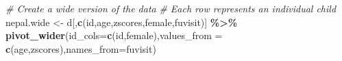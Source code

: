 \documentclass[
]{article}
\newenvironment{Shaded}{\begin{snugshade}}{\end{snugshade}}
\newcommand{\AttributeTok}[1]{\textcolor[rgb]{0.13,0.29,0.53}{#1}}
\newcommand{\CommentTok}[1]{\textcolor[rgb]{0.56,0.35,0.01}{\textit{#1}}}
\newcommand{\FunctionTok}[1]{\textcolor[rgb]{0.13,0.29,0.53}{\textbf{#1}}}
\newcommand{\NormalTok}[1]{#1}
\newcommand{\OtherTok}[1]{\textcolor[rgb]{0.56,0.35,0.01}{#1}}
\newcommand{\SpecialCharTok}[1]{\textcolor[rgb]{0.81,0.36,0.00}{\textbf{#1}}}
\newcommand{\StringTok}[1]{\textcolor[rgb]{0.31,0.60,0.02}{#1}}
\begin{document}
\begin{Shaded}
\begin{Highlighting}[]
\CommentTok{\# Create a wide version of the data}
\CommentTok{\# Each row represents an individual child}
\NormalTok{nepal.wide }\OtherTok{\textless{}{-}}\NormalTok{ d[,}\FunctionTok{c}\NormalTok{(}\StringTok{\textquotesingle{}id\textquotesingle{}}\NormalTok{,}\StringTok{\textquotesingle{}age\textquotesingle{}}\NormalTok{,}\StringTok{\textquotesingle{}zscores\textquotesingle{}}\NormalTok{,}\StringTok{\textquotesingle{}female\textquotesingle{}}\NormalTok{,}\StringTok{\textquotesingle{}fuvisit\textquotesingle{}}\NormalTok{)] }\SpecialCharTok{\%\textgreater{}\%} 
  \FunctionTok{pivot\_wider}\NormalTok{(}\AttributeTok{id\_cols=}\FunctionTok{c}\NormalTok{(id,female),}\AttributeTok{values\_from =} \FunctionTok{c}\NormalTok{(age,zscores),}\AttributeTok{names\_from=}\StringTok{\textquotesingle{}fuvisit\textquotesingle{}}\NormalTok{)}


\end{Highlighting}
\end{Shaded}
\end{document}

